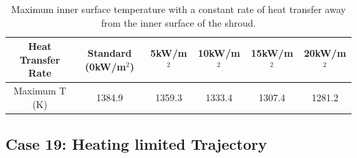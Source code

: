 \begin{table}[ht]
	\centering
	\begin{tabular}{|c|c|c|c|c|c|}
		\hline Heat Transfer Rate & Standard (0kW/m$^2$) & 5kW/m$^2$ & 10kW/m$^2$ & 15kW/m$^2$ & 20kW/m$^2$ \\ 
		\hline Maximum T (K) & 1384.9 & 1359.3 & 1333.4 & 1307.4 & 1281.2 \\ 
		\hline
	\end{tabular}	
	\caption{Maximum inner surface temperature with a constant rate of heat transfer away from the inner surface of the shroud.}
	\label{tab:regenerativecooling}	
\end{table}

\subsection{Case 19: Heating limited Trajectory}
